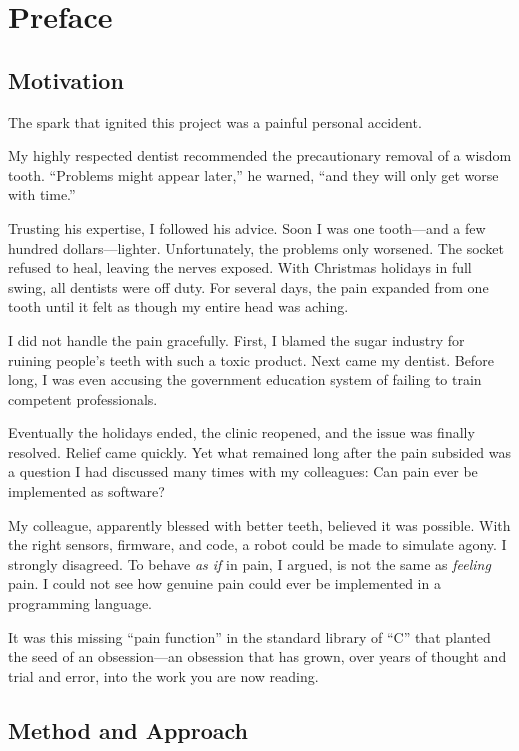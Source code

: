 \chapter{Preface}
\label{chap:preface}

\section*{Motivation}

The spark that ignited this project was a painful personal accident.

My highly respected dentist recommended the precautionary removal of a wisdom tooth. ``Problems might appear later,'' he warned, ``and they will only get worse with time.''

Trusting his expertise, I followed his advice.
Soon I was one tooth---and a few hundred dollars---lighter.
Unfortunately, the problems only worsened.
The socket refused to heal, leaving the nerves exposed.
With Christmas holidays in full swing, all dentists were off duty.
For several days, the pain expanded from one tooth until it felt as though my entire head was aching.

I did not handle the pain gracefully. First, I blamed the sugar industry for ruining people’s teeth with such a toxic product.
Next came my dentist. Before long, I was even accusing the government education system of failing to train competent professionals.

Eventually the holidays ended, the clinic reopened, and the issue was finally resolved.
Relief came quickly.
Yet what remained long after the pain subsided was a question I had discussed many times with my colleagues: Can pain ever be implemented as software?

My colleague, apparently blessed with better teeth, believed it was possible.
With the right sensors, firmware, and code, a robot could be made to simulate agony.
I strongly disagreed.
To behave \emph{as if} in pain, I argued, is not the same as \emph{feeling} pain.
I could not see how genuine pain could ever be implemented in a programming language.

It was this missing ``pain function'' in the standard library of ``C'' that planted the seed of an obsession---an obsession that has grown, over years of thought and trial and error, into the work you are now reading.


\section*{Method and Approach}

